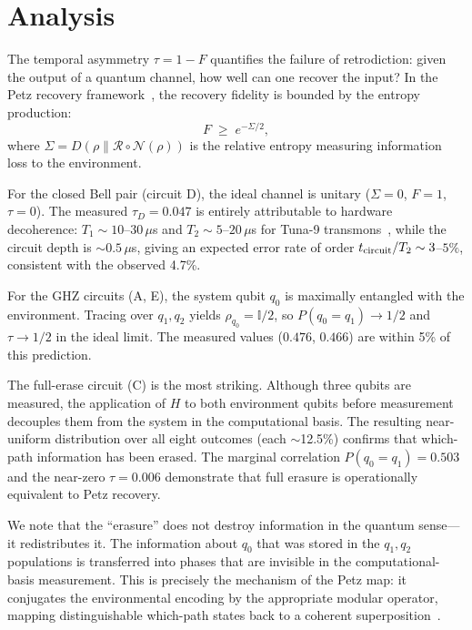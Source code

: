 \documentclass[prl,twocolumn,superscriptaddress,longbibliography,floatfix]{revtex4-2}
\newcommand{\tauasym}{\tau}
\begin{document}
\section{Analysis}

The temporal asymmetry $\tauasym = 1 - F$ quantifies the failure of
retrodiction: given the output of a quantum channel, how well can one
recover the input?  In the Petz recovery
framework~\cite{Petz1986,Petz1988,JRSWW2018,Huang2026}, the recovery
fidelity is bounded by the entropy production:
\begin{equation}\label{eq:bound}
  F \;\geq\; e^{-\Sigma/2},
\end{equation}
where $\Sigma = D(\rho \| \mathcal{R}\circ\mathcal{N}(\rho))$ is the
relative entropy measuring information loss to the environment.

For the closed Bell pair (circuit D), the ideal channel is unitary
($\Sigma = 0$, $F = 1$, $\tauasym = 0$).  The measured
$\tauasym_D = 0.047$ is entirely attributable to hardware
decoherence: $T_1 \sim 10$--$30\,\mu$s and $T_2 \sim 5$--$20\,\mu$s
for Tuna-9 transmons~\cite{Tuna9}, while the circuit depth is
$\sim$$0.5\,\mu$s, giving an expected error rate of order
$t_{\rm circuit}/T_2 \sim 3$--$5\%$, consistent with the observed
4.7\%.

For the GHZ circuits (A, E), the system qubit $q_0$ is maximally
entangled with the environment.  Tracing over $q_1,q_2$ yields
$\rho_{q_0} = \mathbb{I}/2$, so $P(q_0{=}q_1) \to 1/2$ and
$\tauasym \to 1/2$ in the ideal limit.  The measured values
($0.476$, $0.466$) are within 5\% of this prediction.

The full-erase circuit (C) is the most striking.  Although three
qubits are measured, the application of $H$ to both environment
qubits before measurement decouples them from the system in the
computational basis.  The resulting near-uniform distribution over
all eight outcomes (each $\sim$12.5\%) confirms that which-path
information has been erased.  The marginal correlation
$P(q_0{=}q_1) = 0.503$ and the near-zero $\tauasym = 0.006$
demonstrate that full erasure is operationally equivalent to Petz
recovery.

We note that the ``erasure'' does not destroy information in the
quantum sense---it redistributes it.  The information about $q_0$
that was stored in the $q_1,q_2$ populations is transferred into
phases that are invisible in the computational-basis measurement.
This is precisely the mechanism of the Petz map: it conjugates the
environmental encoding by the appropriate modular operator, mapping
distinguishable which-path states back to a coherent
superposition~\cite{Huang2026}.
\end{document}
